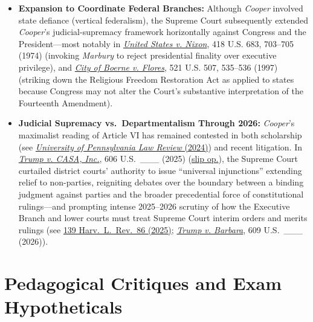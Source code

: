 \documentclass[12pt]{article}
\begin{document}
\begin{itemize}
  \item \textbf{Expansion to Coordinate Federal Branches:} Although \textit{Cooper} involved state defiance (vertical federalism), the Supreme Court subsequently extended \textit{Cooper}'s judicial-supremacy framework horizontally against Congress and the President---most notably in \href{https://supreme.justia.com/cases/federal/us/418/683/}{\textit{United States v. Nixon}}, 418 U.S. 683, 703--705 (1974) (invoking \textit{Marbury} to reject presidential finality over executive privilege), and \href{https://supreme.justia.com/cases/federal/us/521/507/}{\textit{City of Boerne v. Flores}}, 521 U.S. 507, 535--536 (1997) (striking down the Religious Freedom Restoration Act as applied to states because Congress may not alter the Court's substantive interpretation of the Fourteenth Amendment).
  \item \textbf{Judicial Supremacy vs.\ Departmentalism Through 2026:} \textit{Cooper}'s maximalist reading of Article VI has remained contested in both scholarship (see \href{https://pennlawreview.com/2024/03/01/clarifying-judicial-aggrandizement/}{\textit{University of Pennsylvania Law Review} (2024)}) and recent litigation. In \href{https://supreme.justia.com/cases/federal/us/606/24a884/}{\textit{Trump v. CASA, Inc.}}, 606 U.S.\ \_\_\_ (2025) (\href{https://www.supremecourt.gov/opinions/24pdf/24a884_8n59.pdf}{slip op.}), the Supreme Court curtailed district courts' authority to issue ``universal injunctions'' extending relief to non-parties, reigniting debates over the boundary between a binding judgment against parties and the broader precedential force of constitutional rulings---and prompting intense 2025--2026 scrutiny of how the Executive Branch and lower courts must treat Supreme Court interim orders and merits rulings (see \href{https://harvardlawreview.org/wp-content/uploads/2025/11/139-Harv.-L.-Rev.-86.pdf}{139 Harv.\ L.\ Rev.\ 86 (2025)}; \href{https://supreme.justia.com/cases/federal/us/609/25-365/}{\textit{Trump v. Barbara}}, 609 U.S.\ \_\_\_ (2026)).
\end{itemize}

\section{Pedagogical Critiques and Exam Hypotheticals}
\end{document}
